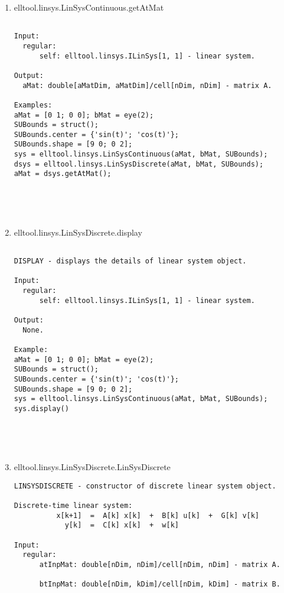 \begin{enumerate}
\begin{lstlisting}
\end{lstlisting}
\fontfamily{\familydefault}
\selectfont
\item {elltool.linsys.LinSysContinuous.getAtMat}
\selectfont
\begin{lstlisting}

Input:
  regular:
      self: elltool.linsys.ILinSys[1, 1] - linear system.

Output:
  aMat: double[aMatDim, aMatDim]/cell[nDim, nDim] - matrix A.

Examples:
aMat = [0 1; 0 0]; bMat = eye(2);
SUBounds = struct();
SUBounds.center = {'sin(t)'; 'cos(t)'};
SUBounds.shape = [9 0; 0 2];
sys = elltool.linsys.LinSysContinuous(aMat, bMat, SUBounds);
dsys = elltool.linsys.LinSysDiscrete(aMat, bMat, SUBounds);
aMat = dsys.getAtMat();





\end{lstlisting}
\fontfamily{\familydefault}
\selectfont
\item {elltool.linsys.LinSysDiscrete.display}
\selectfont
\begin{lstlisting}

DISPLAY - displays the details of linear system object.

Input:
  regular:
      self: elltool.linsys.ILinSys[1, 1] - linear system.

Output:
  None.

Example:
aMat = [0 1; 0 0]; bMat = eye(2);
SUBounds = struct();
SUBounds.center = {'sin(t)'; 'cos(t)'};
SUBounds.shape = [9 0; 0 2];
sys = elltool.linsys.LinSysContinuous(aMat, bMat, SUBounds);
sys.display()





\end{lstlisting}
\fontfamily{\familydefault}
\selectfont
\item {elltool.linsys.LinSysDiscrete.LinSysDiscrete}
\selectfont
\begin{lstlisting}
LINSYSDISCRETE - constructor of discrete linear system object.

Discrete-time linear system:
          x[k+1]  =  A[k] x[k]  +  B[k] u[k]  +  G[k] v[k]
            y[k]  =  C[k] x[k]  +  w[k]

Input:
  regular:
      atInpMat: double[nDim, nDim]/cell[nDim, nDim] - matrix A.

      btInpMat: double[nDim, kDim]/cell[nDim, kDim] - matrix B.


\end{lstlisting}
\end{enumerate}
